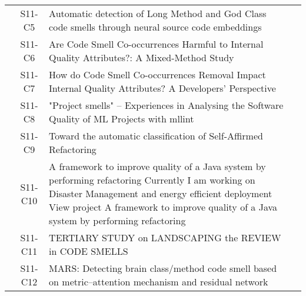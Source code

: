 \begin{longtable}{ccp{9cm}p{3cm}}
    & S11-C5  & Automatic detection of Long Method and God Class code smells through neural source code embeddings                                                                                                                                             & \citeauthor*{Kovačević2022}   \\
    & S11-C6  & Are Code Smell Co-occurrences Harmful to Internal Quality Attributes?: A Mixed-Method Study                                                                                                                                                    & \citeauthor*{Martins2020}     \\
    & S11-C7  & How do Code Smell Co-occurrences Removal Impact Internal Quality Attributes? A Developers' Perspective                                                                                                                                         & \citeauthor*{Martins2021}     \\
    & S11-C8  & "Project smells" -- Experiences in Analysing the Software Quality of ML Projects with mllint                                                                                                                                                   & \citeauthor*{van2022}         \\
    & S11-C9  & Toward the automatic classification of Self-Affirmed Refactoring                                                                                                                                                                               & \citeauthor*{AlOmar2021b}     \\
    & S11-C10 & A framework to improve quality of a Java system by performing refactoring Currently I am working on Disaster Management and energy efficient deployment View project A framework to improve quality of a Java system by performing refactoring & \citeauthor*{Singh2020}       \\
    & S11-C11 & TERTIARY STUDY on LANDSCAPING the REVIEW in CODE SMELLS                                                                                                                                                                                        & \citeauthor*{Yaqoob2021}      \\
    & S11-C12 & MARS: Detecting brain class/method code smell based on metric–attention mechanism and residual network                                                                                                                                         & \citeauthor*{Zhang2021a}       \\

\end{longtable}
